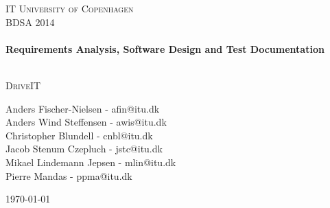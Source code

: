 


%


\begin{center}
\thispagestyle{empty}


\textsc{\LARGE IT University of Copenhagen}\\[1.5cm]

\textsc{\Large BDSA 2014 }\\[0.5cm]

\HRule \\[0.4cm]
{ \huge \bfseries Requirements Analysis, Software Design and Test Documentation \\ [0.4cm]
    }

\HRule \\[1cm]

\textsc{\Large DriveIT}\\[1.5cm]

\begin{minipage}{1\textwidth}
\begin{center} \large
Anders Fischer-Nielsen - afin@itu.dk\\
Anders Wind Steffensen - awis@itu.dk\\
Christopher Blundell - cnbl@itu.dk\\
Jacob Stenum Czepluch - jstc@itu.dk\\
Mikael Lindemann Jepsen - mlin@itu.dk\\
Pierre Mandas - ppma@itu.dk\\
\end{center}
\end{minipage}


\vfill

{\large \today}

\end{center}

\frontmatter%

%
%


\tableofcontents
\newpage
\listoffigures
\newpage

\mainmatter%











